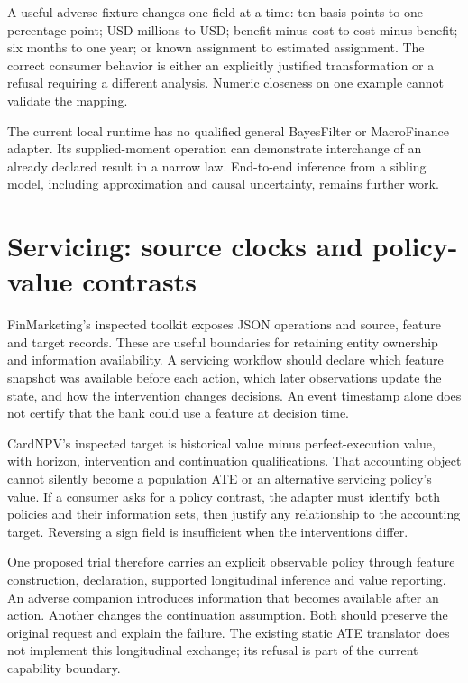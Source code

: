 A useful adverse fixture changes one field at a time: ten basis points to one
percentage point; USD millions to USD; benefit minus cost to cost minus benefit;
six months to one year; or known assignment to estimated assignment. The
correct consumer behavior is either an explicitly justified transformation or
a refusal requiring a different analysis. Numeric closeness on one example
cannot validate the mapping.

The current local runtime has no qualified general BayesFilter or MacroFinance
adapter. Its supplied-moment operation can demonstrate interchange of an
already declared result in a narrow law. End-to-end inference from a sibling
model, including approximation and causal uncertainty, remains further work.

\section{Servicing: source clocks and policy-value contrasts}

FinMarketing's inspected toolkit exposes JSON operations and source, feature
and target records. These are useful boundaries for retaining entity ownership
and information availability.\cite{v12_in_inventory} A servicing workflow should
declare which feature snapshot was available before each action, which later
observations update the state, and how the intervention changes decisions.
An event timestamp alone does not certify that the bank could use a feature
at decision time.

CardNPV's inspected target is historical value minus perfect-execution value,
with horizon, intervention and continuation qualifications.
\cite{v12_in_inventory} That accounting object cannot silently become a
population ATE or an alternative servicing policy's value. If a consumer asks
for a policy contrast, the adapter must identify both policies and their
information sets, then justify any relationship to the accounting target.
Reversing a sign field is insufficient when the interventions differ.

One proposed trial therefore carries an explicit observable policy through
feature construction, declaration, supported longitudinal inference and value
reporting. An adverse companion introduces information that becomes available
after an action. Another changes the continuation assumption. Both should
preserve the original request and explain the failure. The existing static
ATE translator does not implement this longitudinal exchange; its refusal is
part of the current capability boundary.

